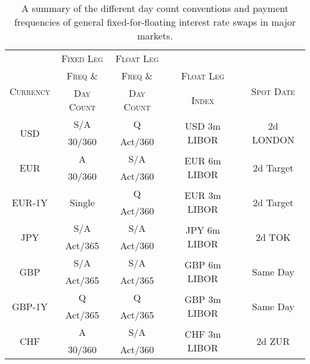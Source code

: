 \begin{table}[ht]
\begin{center}
\begin{tabular}{ccccc}

\toprule
 & \textsc{Fixed Leg} & \textsc{Float Leg} & & \\
\multirow{2}{*}{\textsc{Currency}} & \textsc{Freq \&} & \textsc{Freq \&} & \textsc{Float Leg} & \multirow{2}{*}{\textsc{Spot Date}} \\
 & \textsc{Day Count} & \textsc{Day Count} & \textsc{Index} & \\
\toprule

\multirow{2}{*}{USD} & S/A & Q & \multirow{2}{*}{USD 3m LIBOR} & \multirow{2}{*}{2d LONDON} \\
& 30/360 & Act/360 & & \\

\multirow{2}{*}{EUR} & A & S/A & \multirow{2}{*}{EUR 6m LIBOR} & \multirow{2}{*}{2d Target} \\
& 30/360 & Act/360 & & \\

\multirow{2}{*}{EUR-1Y} & \multirow{2}{*}{Single} & Q & \multirow{2}{*}{EUR 3m LIBOR} & \multirow{2}{*}{2d Target} \\
& & Act/360 & & \\

\multirow{2}{*}{JPY} & S/A & S/A & \multirow{2}{*}{JPY 6m LIBOR} & \multirow{2}{*}{2d TOK} \\
& Act/365 & Act/360 & & \\

\multirow{2}{*}{GBP} & S/A & S/A & \multirow{2}{*}{GBP 6m LIBOR} & \multirow{2}{*}{Same Day} \\
& Act/365 & Act/365 & & \\

\multirow{2}{*}{GBP-1Y} & Q & Q & \multirow{2}{*}{GBP 3m LIBOR} & \multirow{2}{*}{Same Day} \\
& Act/365 & Act/365 & & \\

\multirow{2}{*}{CHF} & A & S/A & \multirow{2}{*}{CHF 3m LIBOR} & \multirow{2}{*}{2d ZUR} \\
& 30/360 & Act/360 & & \\

\toprule

\end{tabular}
\end{center}
\caption[Summary: Day Count Conventions and Interest Payment Frequencies]{A summary of the different day count conventions and payment frequencies of general fixed-for-floating interest rate swaps in major markets.}
\label{tab:dcc_irp}
\end{table}


